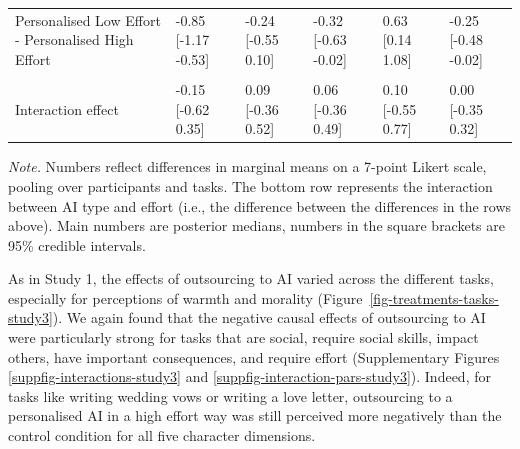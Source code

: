 \documentclass[
  man,
  floatsintext,
  longtable,
  nolmodern,
  notxfonts,
  notimes,
  colorlinks=true,linkcolor=blue,citecolor=blue,urlcolor=blue]{apa7}
\begin{document}
\begin{table}
\begin{tabular}{llllll}
\hspace{1em}Personalised Low Effort - Personalised High Effort & -0.85 [-1.17 -0.53] & -0.24 [-0.55 0.10] & -0.32 [-0.63 -0.02] & 0.63 [0.14 1.08] & -0.25 [-0.48 -0.02]\\
\addlinespace[0.3em]
\multicolumn{6}{l}{\textbf{Interaction effect}}\\
\hspace{1em}Interaction effect & -0.15 [-0.62 0.35] & 0.09 [-0.36 0.52] & 0.06 [-0.36 0.49] & 0.10 [-0.55 0.77] & 0.00 [-0.35 0.32]\\
\bottomrule
\end{tabular}
\endgroup{}\vspace{20pt}

\vspace{-20pt}
\noindent \emph{Note.} Numbers reflect differences in marginal means on
a 7-point Likert scale, pooling over participants and tasks. The bottom
row represents the interaction between AI type and effort (i.e., the
difference between the differences in the rows above). Main numbers are
posterior medians, numbers in the square brackets are 95\% credible
intervals.

\end{table}

As in Study 1, the effects of outsourcing to AI varied across the
different tasks, especially for perceptions of warmth and morality
(Figure~\ref{fig-treatments-tasks-study3}). We again found that the
negative causal effects of outsourcing to AI were particularly strong
for tasks that are social, require social skills, impact others, have
important consequences, and require effort (Supplementary Figures
\ref{suppfig-interactions-study3} and
\ref{suppfig-interaction-pars-study3}). Indeed, for tasks like writing
wedding vows or writing a love letter, outsourcing to a personalised AI
in a high effort way was still perceived more negatively than the
control condition for all five character dimensions.
\end{document}
